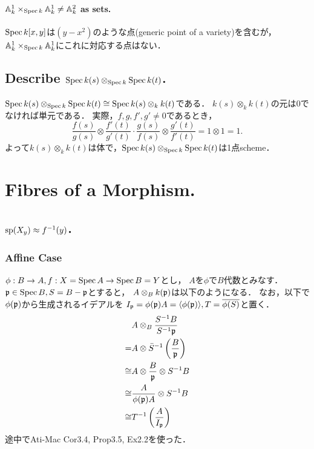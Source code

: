 \documentclass[a4paper]{jsarticle}
\newcommand{\basesp}{\operatorname{sp}}
\begin{document}
    \paragraph{$\mathbb{A}^1_k \times_{\operatorname{Spec} k} \mathbb{A}^1_k \neq \mathbb{A}^2_k$ as sets.}
    $\operatorname{Spec} k[x,y]$は$(y-x^2)$のような点(generic point of a variety)を含むが，
    $\mathbb{A}^1_k \times_{\operatorname{Spec} k} \mathbb{A}^1_k$にこれに対応する点はない．

    \subsection{Describe $\operatorname{Spec} k(s) \otimes_{\operatorname{Spec} k} \operatorname{Spec} k(t)$.}
    $\operatorname{Spec} k(s) \otimes_{\operatorname{Spec} k} \operatorname{Spec} k(t) \cong \operatorname{Spec} k(s) \otimes_k k(t)$である．
    $k(s) \otimes_k k(t)$の元は$0$でなければ単元である．
    実際，$f,g,f',g' \neq 0$であるとき，
    \[ \frac{f(s)}{g(s)} \otimes \frac{f'(t)}{g'(t)} \cdot \frac{g(s)}{f(s)} \otimes \frac{g'(t)}{f'(t)}=1 \otimes 1=1. \]
    よって$k(s) \otimes_k k(t)$は体で，$\operatorname{Spec} k(s) \otimes_{\operatorname{Spec} k} \operatorname{Spec} k(t)$は1点scheme．

\section{Fibres of a Morphism.} %
\subsection{$\basesp(X_y) \homeo f^{-1}(y)$.}
    \subsubsection{Affine Case}
    $\phi: B \to A, f: X=\operatorname{Spec} A \to \operatorname{Spec} B=Y$とし，
    $A$を$\phi$で$B$代数とみなす．
    $\mathfrak{p} \in \operatorname{Spec} B, S=B-\mathfrak{p}$とすると，
    $A \otimes_B k(\mathfrak{p})$は以下のようになる．
    なお，以下で$\phi(\mathfrak{p})$から生成されるイデアルを
    $I_{\mathfrak{p}}=\phi(\mathfrak{p})A=\langle \phi(\mathfrak{p}) \rangle, T=\overline{\phi(S)}$と置く．
    \begin{align*}
        {}& A \otimes_B \frac{S^{-1}B}{S^{-1}\mathfrak{p}} \\
        =& A \otimes \bar{S}^{-1}\left( \frac{B}{\mathfrak{p}} \right) \\
        \cong& A \otimes \frac{B}{\mathfrak{p}} \otimes S^{-1}B \\
        \cong& \frac{A}{\phi(\mathfrak{p})A} \otimes S^{-1}B \\
        \cong& T^{-1}\left( \frac{A}{I_{\mathfrak{p}}} \right)
    \end{align*}
    途中でAti-Mac Cor3.4, Prop3.5, Ex2.2を使った．
\end{document}
